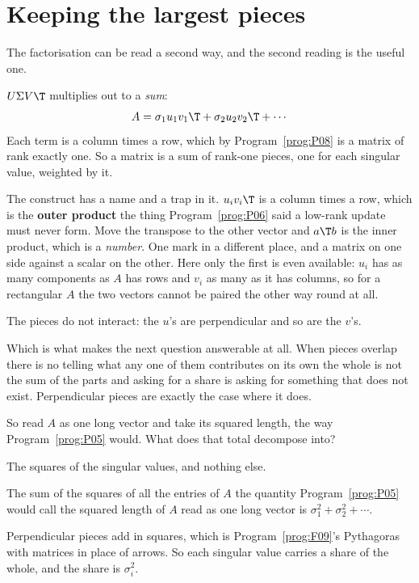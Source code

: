 \section{Keeping the largest pieces}
\label{sec:P11-lowrank}

\begin{fr}
The factorisation can be read a second way, and the second reading is the
useful one.

$U\Sigma V\T$ multiplies out to a \emph{sum}:
\[ A = \sigma_1 u_1v_1\T + \sigma_2u_2v_2\T + \cdots \]
Each term is a column times a row, which by Program~\ref{prog:P08} is a matrix
of rank exactly one. So a matrix is a sum of rank-one pieces, one for each
singular value, weighted by it.

The construct has a name and a trap in it. $u_i v_i\T$ is a column times a
row, which is the \textbf{outer product} \dash{} the thing
Program~\ref{prog:P06} said a low-rank update must never form. Move the
transpose to the other vector and $a\T b$ is the inner product, which is a
\emph{number}. One mark in a different place, and a matrix on one side against
a scalar on the other. Here only the first is even available: $u_i$ has as many
components as $A$ has rows and $v_i$ as many as it has columns, so for a
rectangular $A$ the two vectors cannot be paired the other way round at all.

The pieces do not interact: the $u$'s are perpendicular and so are the $v$'s.

Which is what makes the next question answerable at all. When pieces overlap
there is no telling what any one of them contributes on its own \dash{} the
whole is not the sum of the parts and asking for a share is asking for
something that does not exist. Perpendicular pieces are exactly the case where
it does.

So read $A$ as one long vector and take its squared length, the way
Program~\ref{prog:P05} would. What does that total decompose into?
\dotline
\nextframe
\end{fr}

\begin{fr}
\begin{ansblock}
The squares of the singular values, and nothing else.
\end{ansblock}

The sum of the squares of all the entries of $A$ \dash{} the quantity
Program~\ref{prog:P05} would call the squared length of $A$ read as one long
vector \dash{} is $\sigma_1^{2} + \sigma_2^{2} + \cdots$.

Perpendicular pieces add in squares, which is Program~\ref{prog:F09}'s
Pythagoras with matrices in place of arrows. So each singular value carries a
share of the whole, and the share is $\sigma_i^{2}$.
\end{fr}

